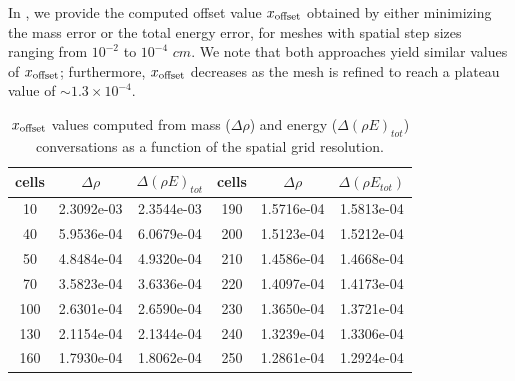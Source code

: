 \documentclass[times,doublespace]{fldauth}%
\begin{document}
In , we provide the computed offset value $x_{\text{\text{offset}}}$ obtained by either minimizing the mass error
or the total energy error, for meshes with spatial step sizes ranging from $10^{-2}$ to $10^{-4}$ $cm$.
We note that both approaches yield similar values of $x_{\text{\text{offset}}}$; furthermore, $x_{\text{\text{offset}}}$ decreases as the mesh is refined to reach a plateau value of $\sim 1.3 \times 10^{-4}$.
%
\begin{table}[h]
\begin{center}
\begin{tabular}{ |c|c|c||c|c|c| }
\hline
 cells & $\Delta \rho$ & $\Delta (\rho E)_{tot}$ &  cells & $\Delta \rho$ & $\Delta (\rho E_{tot})$ \\ \hline
10 & 2.3092e-03 & 2.3544e-03 & 190 & 1.5716e-04 & 1.5813e-04 \\ \hline
40 & 5.9536e-04 & 6.0679e-04 & 200 & 1.5123e-04 & 1.5212e-04 \\ \hline
50 & 4.8484e-04 & 4.9320e-04 & 210 & 1.4586e-04 & 1.4668e-04 \\ \hline
70 & 3.5823e-04 & 3.6336e-04 & 220 & 1.4097e-04 & 1.4173e-04 \\ \hline
100 & 2.6301e-04 & 2.6590e-04 & 230 & 1.3650e-04 & 1.3721e-04 \\ \hline
130 & 2.1154e-04 & 2.1344e-04 & 240 & 1.3239e-04 & 1.3306e-04 \\ \hline
160 & 1.7930e-04 & 1.8062e-04 & 250 & 1.2861e-04 & 1.2924e-04 \\ \hline
\end{tabular}
\end{center}
\caption{$x_{\text{\text{offset}}}$ values computed from mass ($\Delta \rho$) and energy ($\Delta (\rho E)_{tot}$) conversations as a function of the spatial grid resolution.}\label{tbl:mach-1p05-x-offset}
\end{table}
\end{document}
